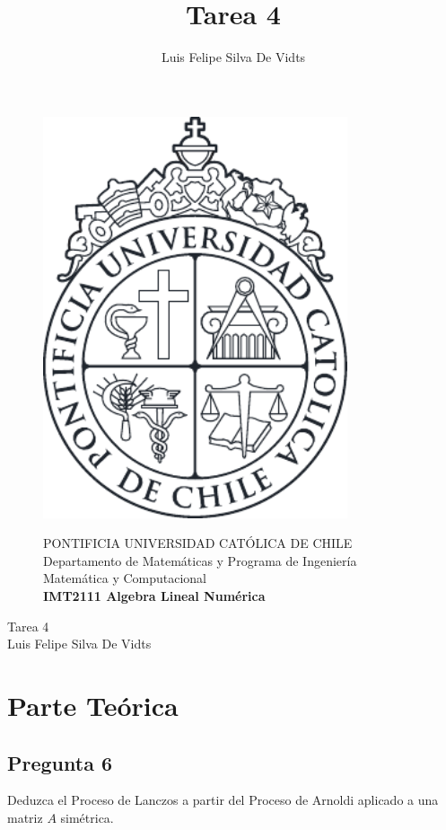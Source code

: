 \documentclass{article}
\title{Tarea 4\\}
\author{Luis Felipe Silva De Vidts}
\begin{document}
\begin{figure}
\begin{minipage}{2.5cm}
\includegraphics[width=0.8\textwidth]{./figures/LogoUC-BN}
\end{minipage}
\begin{minipage}{14.5cm}
\vspace{4mm}
{\sc PONTIFICIA UNIVERSIDAD CAT\'OLICA DE CHILE}\\
Departamento de Matemáticas y Programa de Ingeniería Matemática y Computacional \\
{\bf IMT2111 Algebra Lineal Numérica}\\
\vspace{0mm}
\hrulefill
\end{minipage}
\end{figure}
\phantom{""}
\vspace{-5mm}
\normalsize
\begin{center}
\Huge Tarea 4\\
\normalsize Luis Felipe Silva De Vidts
\end{center}
\section*{Parte Teórica}
\subsection*{Pregunta 6}
Deduzca el Proceso de Lanczos a partir del Proceso de Arnoldi aplicado a una matriz $A$ simétrica.
\end{document}
